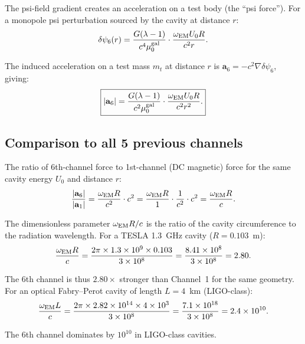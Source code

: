 \documentclass[11pt,twocolumn]{article}
\newcommand{\dpsi}{\delta\psi}
\newcommand{\lam}{\lambda}
\newcommand{\ee}[1]{\times 10^{#1}}
\begin{document}
The psi-field gradient creates an acceleration on a test body (the
``psi force''). For a monopole psi perturbation sourced by the cavity
at distance $r$:
\begin{equation}
\dpsi_6(r) = \frac{G(\lam-1)}{c^4\mu_0^{\rm gal}}
\cdot\frac{\omega_{\rm EM} U_0 R}{c^2 r}.
\label{eq:dpsi6}
\end{equation}

The induced acceleration on a test mass $m_t$ at distance $r$ is
$\mathbf{a}_6 = -c^2\nabla\dpsi_6$, giving:
\begin{equation}
\boxed{
|\mathbf{a}_6| = \frac{G(\lam-1)}{c^2\mu_0^{\rm gal}}
\cdot\frac{\omega_{\rm EM} U_0 R}{c^2 r^2}.
}
\label{eq:accel6}
\end{equation}

\subsection{Comparison to all 5 previous channels}

The ratio of 6th-channel force to 1st-channel (DC magnetic) force
for the same cavity energy $U_0$ and distance $r$:
\begin{equation}
\frac{|\mathbf{a}_6|}{|\mathbf{a}_1|}
= \frac{\omega_{\rm EM} R}{c^2}\cdot c^2
= \frac{\omega_{\rm EM} R}{1} \cdot\frac{1}{c^2}\cdot c^2
= \frac{\omega_{\rm EM} R}{c}.
\label{eq:ratio6to1}
\end{equation}

The dimensionless parameter $\omega_{\rm EM}R/c$ is the ratio of the
cavity circumference to the radiation wavelength. For a TESLA 1.3~GHz
cavity ($R = 0.103$~m):
\begin{equation}
\frac{\omega_{\rm EM}R}{c}
= \frac{2\pi\times1.3\ee{9}\times0.103}{3\ee{8}}
= \frac{8.41\ee{8}}{3\ee{8}} = 2.80.
\label{eq:tesla_factor}
\end{equation}

The 6th channel is thus $2.80\times$ stronger than Channel~1 for the
same geometry. For an optical Fabry--Perot cavity of length $L = 4$~km
(LIGO-class):
\begin{equation}
\frac{\omega_{\rm EM}L}{c}
= \frac{2\pi\times2.82\ee{14}\times4\ee{3}}{3\ee{8}}
= \frac{7.1\ee{18}}{3\ee{8}} = 2.4\ee{10}.
\label{eq:ligo_factor}
\end{equation}

The 6th channel dominates by $10^{10}$ in LIGO-class cavities.
\end{document}
